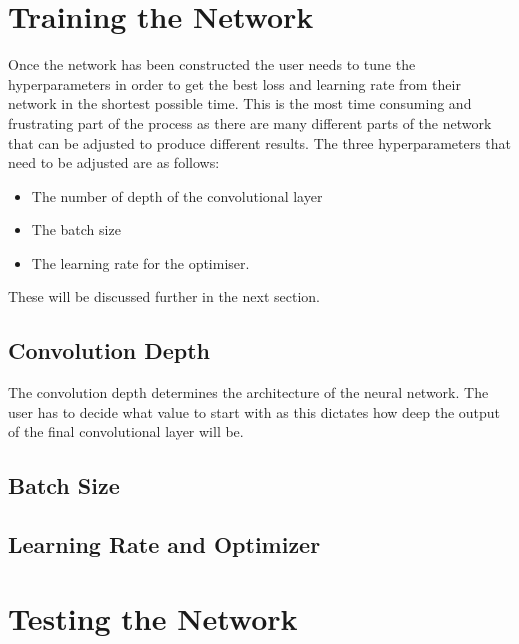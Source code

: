 \section{Training the Network}
Once the network has been constructed the user needs to tune the hyperparameters in order to get the best loss and learning rate from their network in the shortest possible time. This is the most time consuming and frustrating part of the process as there are many different parts of the network that can be adjusted to produce different results. The three hyperparameters that need to be adjusted are as follows:
\begin{itemize}
    \item The number of depth of the convolutional layer
    \item The batch size
    \item The learning rate for the optimiser.
\end{itemize}
These will be discussed further in the next section.
\subsection{Convolution Depth}
The convolution depth determines the architecture of the neural network. The user has to decide what value to start with as this dictates how deep the output of the final convolutional layer will be.
\subsection{Batch Size}
\subsection{Learning Rate and Optimizer}


\section{Testing the Network}